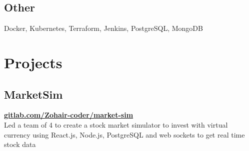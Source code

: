 \documentclass[]{deedy-resume-openfont}
\begin{document}
\begin{minipage}[t]{0.33\textwidth}
    \subsection{Other}
    Docker, Kubernetes, Terraform,
    Jenkins, PostgreSQL, MongoDB
    
    
    
        
        \vspace{\topsep}
        \section {Projects}
        
        \subsection{MarketSim}
        \textbf{\href{https://gitlab.com/Zohair-coder/market-sim}{gitlab.com/Zohair-coder/market-sim}} \\
        \vspace{\topsep}
        Led a team of 4 to create a stock market simulator to invest with virtual currency using React.js, Node.js, PostgreSQL and web sockets to get real time stock data
        
        \vspace{\topsep}
        

\end{minipage}
\end{document}
